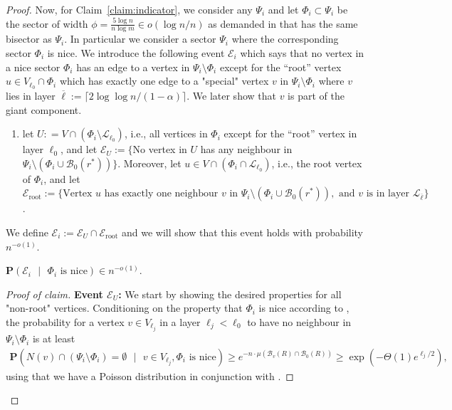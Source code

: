 \documentclass[letterpaper,11pt]{article}
\newcommand{\Prob}[1]{\mathbf{P}\left(#1\right)}
\newcommand{\B}{\mathcal B}
\newcommand{\1}{\mathbb I}
\newcommand{\Layer}[1]{\mathcal{L}_{#1}}
\begin{document}
\begin{proof}
Now, for Claim~\ref{claim:indicator}, we consider any $\Psi_i$ and let $\Phi_i \subset \Psi_i$ be the sector of width $\phi = \frac{5\log n}{n\log m} \in o(\log n / n)$ as demanded in  that has the same bisector as $\Psi_i$. In particular we consider a sector $\Psi_i$ where the corresponding sector $\Phi_i$ is nice. We introduce the following event $\mathcal{E}_i$ which says that no vertex in a nice sector $\Phi_i$ has an edge to a vertex in $\Psi_i \setminus \Phi_i$ except for the ``root'' vertex $u \in V_{\ell_0} \cap \Phi_i$ which has exactly one edge to a "special" vertex $v$ in $\Psi_i\setminus \Phi_i$ where $v$ lies in layer $\overline{\ell} := \lceil 2\log\log n/(1-\alpha)\rceil$. We later show that $v$ is part of the giant component.
%
\begin{enumerate}
\item[\textbf{Event $\mathcal{E}_i$}:]\label{item:eventful}
 let $U: = V \cap (\Phi_i \setminus \Layer{\ell_0})$, i.e., all vertices in $\Phi_i$ except for the ``root'' vertex in layer $\ell_0$, and let $\mathcal{E}_U:= \{$No vertex in $U$ has any neighbour in $\Psi_i \setminus (\Phi_i \cup \B_0(r^*))\}$. Moreover, let $u \in V \cap (\Phi_i \cap \Layer{\ell_0})$, i.e., the root vertex of $\Phi_i$, and let $\mathcal{E}_{\text{root}}:= \{\text{Vertex } u \text{ has exactly one neighbour $v$ in  } \Psi_i \setminus (\Phi_i \cup \B_0(r^*)), \text{ and } v \text{ is in layer } \Layer{\overline{\ell}}\}$.
\end{enumerate}
%
We define $\mathcal{E}_i := \mathcal{E}_U \cap \mathcal{E}_{\text{root}}$ and we will show that this event holds with probability $ n^{-o(1)}$. 
%
\begin{claim}\label{claim:indicator}
  $\Prob{\mathcal{E}_i \text{ }|\text{ } \Phi_i \text{ is nice}} \in n^{-o(1)}$. 
\end{claim}
%
{
\renewcommand{\qedsymbol}{$\blacksquare$} %
\begin{proof}[Proof of claim]
%
\textbf{Event $\mathcal{E}_U$:} We start by showing the desired properties for all "non-root" vertices. Conditioning on the property that $\Phi_i$ is nice according to , the probability for a vertex $v \in V_{\ell_j}$ in a layer $\ell_j < \ell_0$ to have no neighbour in $\Psi_i \setminus \Phi_i$ is at least
%
\begin{align}\label{eq:nice1}
\Prob{N(v) \cap  (\Psi_i \setminus \Phi_i) = \emptyset \text{ }|\text{ } v \in V_{\ell_j}, \Phi_i \text{ is nice}} \geq e^{-n\cdot\mu(\B_v(R) \cap \B_0(R))} \geq \exp{\left(-\Theta(1)e^{\ell_j /2}\right)},    
\end{align}
%
using that we have a Poisson distribution in conjunction with .


\end{proof}}
\end{proof}
\end{document}
